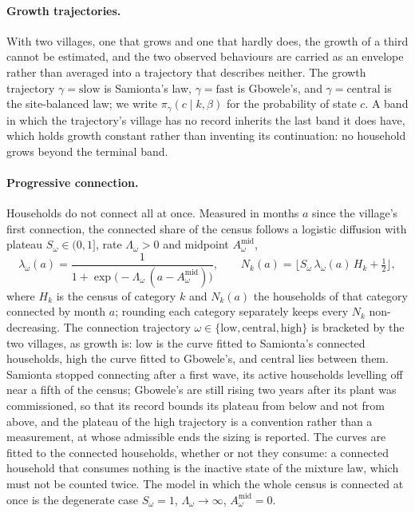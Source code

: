 \documentclass[11pt,a4paper]{article}
\theoremstyle{plain}
\theoremstyle{definition}
\begin{document}
\paragraph{Growth trajectories.} With two villages, one that grows and one that hardly does,
the growth of a third cannot be estimated, and the two observed behaviours are carried as an
envelope rather than averaged into a trajectory that describes neither. The growth
trajectory $\gamma=\mathrm{slow}$ is Samionta's law, $\gamma=\mathrm{fast}$ is Gbowele's,
and $\gamma=\mathrm{central}$ is the site-balanced law; we write $\pi_\gamma(c\mid k,\beta)$
for the probability of state $c$. A band in which the trajectory's village has no record
inherits the last band it does have, which holds growth constant rather than inventing its
continuation: no household grows beyond the terminal band.

\paragraph{Progressive connection.} Households do not connect all at once. Measured in months
$a$ since the village's first connection, the connected share of the census follows a
logistic diffusion with plateau $S_\omega\in(0,1]$, rate $\Lambda_\omega>0$ and midpoint
$A^{\mathrm{mid}}_\omega$,
\begin{equation}
  \lambda_\omega(a) = \frac{1}{1+\exp\!\big(-\Lambda_\omega\,(a-A^{\mathrm{mid}}_\omega)\big)},
  \qquad
  N_k(a) = \Big\lfloor S_\omega\,\lambda_\omega(a)\,H_k + \tfrac12 \Big\rfloor,
  \label{eq:connection}
\end{equation}
where $H_k$ is the census of category $k$ and $N_k(a)$ the households of that category
connected by month $a$; rounding each category separately keeps every $N_k$ non-decreasing.
The connection trajectory $\omega\in\{\mathrm{low},\mathrm{central},\mathrm{high}\}$ is
bracketed by the two villages, as growth is: $\mathrm{low}$ is the curve fitted to
Samionta's connected households, $\mathrm{high}$ the curve fitted to Gbowele's, and
$\mathrm{central}$ lies between them. Samionta stopped connecting after a first wave, its
active households levelling off near a fifth of the census; Gbowele's are still rising two
years after its plant was commissioned, so that its record bounds its plateau from below
and not from above, and the plateau of the high trajectory is a convention rather than a
measurement, at whose admissible ends the sizing is reported. The curves are fitted to the connected households, whether or not they
consume: a connected household that consumes nothing is the inactive state of the mixture
law, which must not be counted twice. The model in which the whole census is connected at
once is the degenerate case $S_\omega=1$, $\Lambda_\omega\to\infty$,
$A^{\mathrm{mid}}_\omega=0$.
\end{document}
